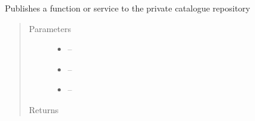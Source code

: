 \documentclass[letterpaper,10pt,english]{sphinxmanual}
\begin{document}

\begin{fulllineitems}
\label{_source/son_editor.impl:son_editor.impl.private_catalogue_impl.publish_private_nsfs}
Publishes a function or service to the private catalogue repository
\begin{quote}\begin{description}
\item[{Parameters}] \leavevmode\begin{itemize}
\item {} 
 -- 

\item {} 
 -- 

\item {} 
 -- 

\end{itemize}

\item[{Returns}] \leavevmode


\end{description}\end{quote}

\end{fulllineitems}

\end{document}
